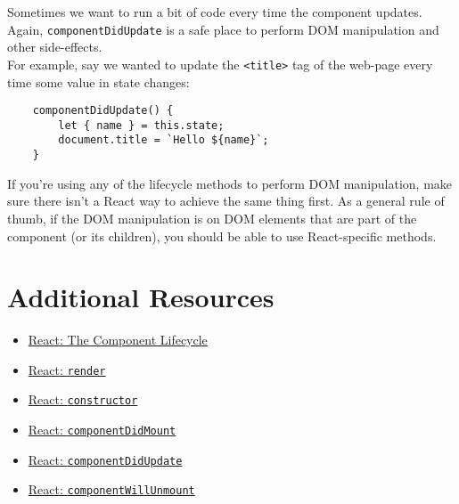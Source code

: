 Sometimes we want to run a bit of code every time the component updates.
\\

Again, \texttt{componentDidUpdate} is a safe place to perform DOM manipulation and other side-effects.
\\

For example, say we wanted to update the \texttt{<title>} tag of the web-page every time some value in state changes:

\begin{verbatim}
    componentDidUpdate() {
        let { name } = this.state;
        document.title = `Hello ${name}`;
    }
\end{verbatim}

If you're  using any of the lifecycle methods to perform DOM manipulation, make sure there isn't a React way to achieve the same thing first. As a general rule of thumb, if the DOM manipulation is on DOM elements that are part of the component (or its children), you should be able to use React-specific methods.



\section{Additional Resources}

\begin{itemize}[leftmargin=*]
    \item \href{https://reactjs.org/docs/react-component.html#the-component-lifecycle}{React: The Component Lifecycle}
    \item \href{https://reactjs.org/docs/react-component.html#render}{React: \texttt{render}}
    \item \href{https://reactjs.org/docs/react-component.html#constructor}{React: \texttt{constructor}}
    \item \href{https://reactjs.org/docs/react-component.html#componentdidmount}{React: \texttt{componentDidMount}}
    \item \href{https://reactjs.org/docs/react-component.html#componentdidupdate}{React: \texttt{componentDidUpdate}}
    \item \href{https://reactjs.org/docs/react-component.html#componentwillunmount}{React: \texttt{componentWillUnmount}}
\end{itemize}
